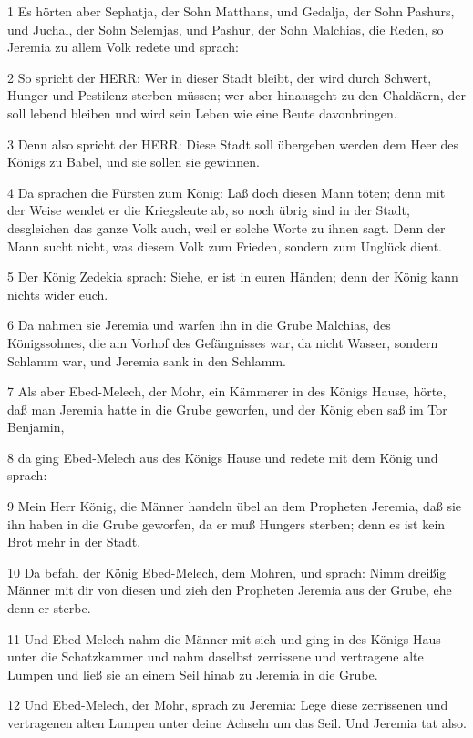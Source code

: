 \par 1 Es hörten aber Sephatja, der Sohn Matthans, und Gedalja, der Sohn Pashurs, und Juchal, der Sohn Selemjas, und Pashur, der Sohn Malchias, die Reden, so Jeremia zu allem Volk redete und sprach:
\par 2 So spricht der HERR: Wer in dieser Stadt bleibt, der wird durch Schwert, Hunger und Pestilenz sterben müssen; wer aber hinausgeht zu den Chaldäern, der soll lebend bleiben und wird sein Leben wie eine Beute davonbringen.
\par 3 Denn also spricht der HERR: Diese Stadt soll übergeben werden dem Heer des Königs zu Babel, und sie sollen sie gewinnen.
\par 4 Da sprachen die Fürsten zum König: Laß doch diesen Mann töten; denn mit der Weise wendet er die Kriegsleute ab, so noch übrig sind in der Stadt, desgleichen das ganze Volk auch, weil er solche Worte zu ihnen sagt. Denn der Mann sucht nicht, was diesem Volk zum Frieden, sondern zum Unglück dient.
\par 5 Der König Zedekia sprach: Siehe, er ist in euren Händen; denn der König kann nichts wider euch.
\par 6 Da nahmen sie Jeremia und warfen ihn in die Grube Malchias, des Königssohnes, die am Vorhof des Gefängnisses war, da nicht Wasser, sondern Schlamm war, und Jeremia sank in den Schlamm.
\par 7 Als aber Ebed-Melech, der Mohr, ein Kämmerer in des Königs Hause, hörte, daß man Jeremia hatte in die Grube geworfen, und der König eben saß im Tor Benjamin,
\par 8 da ging Ebed-Melech aus des Königs Hause und redete mit dem König und sprach:
\par 9 Mein Herr König, die Männer handeln übel an dem Propheten Jeremia, daß sie ihn haben in die Grube geworfen, da er muß Hungers sterben; denn es ist kein Brot mehr in der Stadt.
\par 10 Da befahl der König Ebed-Melech, dem Mohren, und sprach: Nimm dreißig Männer mit dir von diesen und zieh den Propheten Jeremia aus der Grube, ehe denn er sterbe.
\par 11 Und Ebed-Melech nahm die Männer mit sich und ging in des Königs Haus unter die Schatzkammer und nahm daselbst zerrissene und vertragene alte Lumpen und ließ sie an einem Seil hinab zu Jeremia in die Grube.
\par 12 Und Ebed-Melech, der Mohr, sprach zu Jeremia: Lege diese zerrissenen und vertragenen alten Lumpen unter deine Achseln um das Seil. Und Jeremia tat also.
